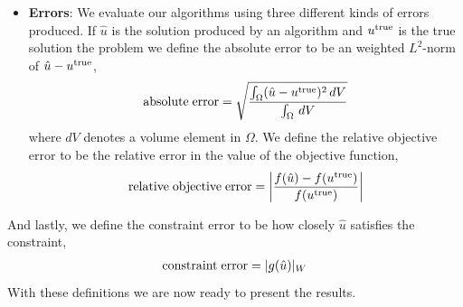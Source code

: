 \begin{itemize}
\item\textbf{Errors}: We evaluate our algorithms using three different kinds of errors produced.
If $\hat u$ is the solution produced by an algorithm and $u^{\rm true}$ is the true solution the problem we define the absolute error to be an weighted $L^2$-norm  of $\hat u-u^{\rm true}$,
\begin{align}
{\rm absolute\;error}=\sqrt{\frac{\int_{\Omega}(\hat u-u^{\rm true})^2\,dV}{\int_{\Omega}\,dV}}
\end{align}
where $dV$ denotes a volume element in $\Omega$. We define the relative objective error to be the relative error in the value of the objective function, 
\begin{align}
{\rm relative\; objective\; error}=\left|\frac{f(\hat u)-f(u^{\rm true})}{f(u^{\rm true})}\right|\label{eq:rel-err--var-ml}
\end{align}
\end{itemize}
And lastly, we define the constraint error to be how closely $\hat u$ satisfies the constraint,
\begin{align}
    {\rm constraint\; error}= |g(\hat u)|_W
\end{align}
With these definitions we are now ready to present the results.     

